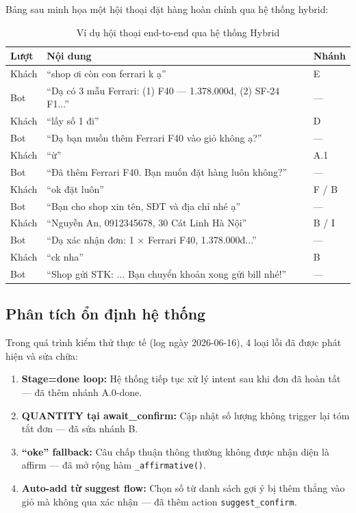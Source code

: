 \documentclass[12pt, a4paper]{report}
\begin{document}
Bảng sau minh họa một hội thoại đặt hàng hoàn chỉnh
qua hệ thống hybrid:

\begin{table}[H]
\centering
\caption{Ví dụ hội thoại end-to-end qua hệ thống Hybrid}
\label{tab:convo_example}
\begin{tabularx}{\linewidth}{lXl}
\toprule
\textbf{Lượt} & \textbf{Nội dung} & \textbf{Nhánh} \\
\midrule
Khách & ``shop ơi còn con ferrari k ạ'' & E \\
Bot   & ``Dạ có 3 mẫu Ferrari: (1) F40 — 1.378.000đ, (2) SF-24 F1...'' & — \\
Khách & ``lấy số 1 đi'' & D \\
Bot   & ``Dạ bạn muốn thêm Ferrari F40 vào giỏ không ạ?'' & — \\
Khách & ``ừ'' & A.1 \\
Bot   & ``Đã thêm Ferrari F40. Bạn muốn đặt hàng luôn không?'' & — \\
Khách & ``ok đặt luôn'' & F / B \\
Bot   & ``Bạn cho shop xin tên, SĐT và địa chỉ nhé ạ'' & — \\
Khách & ``Nguyễn An, 0912345678, 30 Cát Linh Hà Nội'' & B / I \\
Bot   & ``Dạ xác nhận đơn: 1 × Ferrari F40, 1.378.000đ...'' & — \\
Khách & ``ck nha'' & B \\
Bot   & ``Shop gửi STK: ... Bạn chuyển khoản xong gửi bill nhé!'' & — \\
\bottomrule
\end{tabularx}
\end{table}

\subsection{Phân tích ổn định hệ thống}

Trong quá trình kiểm thử thực tế (log ngày 2026-06-16),
4 loại lỗi đã được phát hiện và sửa chữa:

\begin{enumerate}
  \item \textbf{Stage=done loop:} Hệ thống tiếp tục xử lý intent
        sau khi đơn đã hoàn tất — đã thêm nhánh A.0-done.
  \item \textbf{QUANTITY tại await\_confirm:} Cập nhật số lượng
        không trigger lại tóm tắt đơn — đã sửa nhánh B.
  \item \textbf{``oke'' fallback:} Câu chấp thuận thông thường
        không được nhận diện là affirm — đã mở rộng hàm \texttt{\_affirmative()}.
  \item \textbf{Auto-add từ suggest flow:} Chọn số từ danh sách gợi ý
        bị thêm thẳng vào giỏ mà không qua xác nhận —
        đã thêm action \texttt{suggest\_confirm}.
\end{enumerate}
\end{document}
